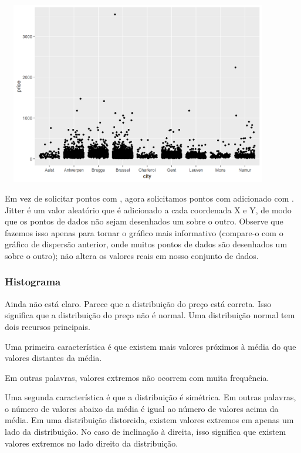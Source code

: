 \documentclass{article}
\begin{document}
\begin{center}
\includegraphics[width=12cm,height=8cm]{intro_jitter-1.png}
\end{center}

Em vez de solicitar pontos com , agora solicitamos pontos com  adicionado com . Jitter é um valor aleatório que é adicionado a cada coordenada X e Y, de modo que os pontos de dados não sejam desenhados um sobre o outro. Observe que fazemos isso apenas para tornar o gráfico mais informativo (compare-o com o gráfico de dispersão anterior, onde muitos pontos de dados são desenhados um sobre o outro); não altera os valores reais em nosso conjunto de dados.

\subsubsection{Histograma}

Ainda não está claro. Parece que a distribuição do preço está correta. Isso significa que a distribuição do preço não é normal. Uma distribuição normal tem dois recursos principais.

Uma primeira característica é que existem mais valores próximos à média do que valores distantes da média.

Em outras palavras, valores extremos não ocorrem com muita frequência.

Uma segunda característica é que a distribuição é simétrica. Em outras palavras, o número de valores abaixo da média é igual ao número de valores acima da média. Em uma distribuição distorcida, existem valores extremos em apenas um lado da distribuição. No caso de inclinação à direita, isso significa que existem valores extremos no lado direito da distribuição.
\end{document}

